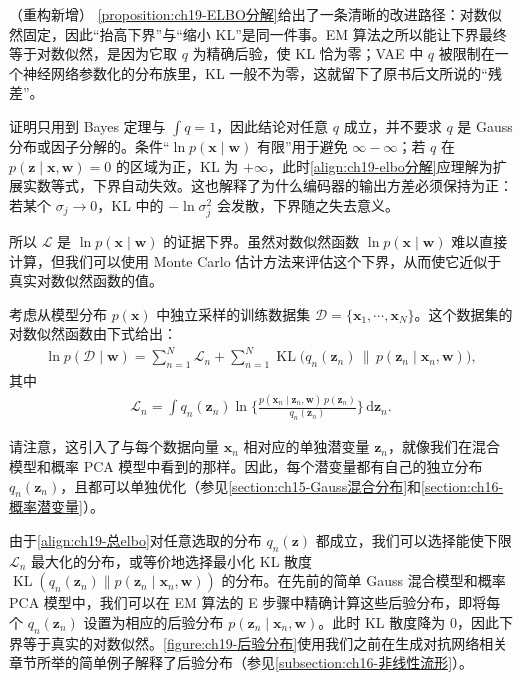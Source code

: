 \documentclass[../../main.tex]{subfiles}
\begin{document}
\begin{remark}（重构新增）
\cref{proposition:ch19-ELBO分解}给出了一条清晰的改进路径：对数似然固定，因此“抬高下界”与“缩小 KL”是同一件事。EM 算法之所以能让下界最终等于对数似然，是因为它取 $q$ 为精确后验，使 KL 恰为零；VAE 中 $q$ 被限制在一个神经网络参数化的分布族里，KL 一般不为零，这就留下了原书后文所说的“残差”。

证明只用到 Bayes 定理与 $\int q=1$，因此结论对任意 $q$ 成立，并不要求 $q$ 是 Gauss 分布或因子分解的。条件“$\ln p(\bm{x}\mid\bm{w})$ 有限”用于避免 $\infty-\infty$；若 $q$ 在 $p(\bm{z}\mid\bm{x},\bm{w})=0$ 的区域为正，KL 为 $+\infty$，此时\eqref{align:ch19-elbo分解}应理解为扩展实数等式，下界自动失效。这也解释了为什么编码器的输出方差必须保持为正：若某个 $\sigma_j\to0$，KL 中的 $-\ln\sigma_j^{2}$ 会发散，下界随之失去意义。
\end{remark}

所以 $\mathcal{L}$ 是 $\ln p(\bm{x}\mid\bm{w})$ 的证据下界。虽然对数似然函数 $\ln p(\bm{x}\mid\bm{w})$ 难以直接计算，但我们可以使用 Monte Carlo 估计方法来评估这个下界，从而使它近似于真实对数似然函数的值。

考虑从模型分布 $p(\bm{x})$ 中独立采样的训练数据集 $\mathcal{D}=\{\bm{x}_1,\cdots,\bm{x}_N\}$。这个数据集的对数似然函数由下式给出：
\begin{align}
\ln p(\mathcal{D}\mid\bm{w})=\sum_{n=1}^{N}\mathcal{L}_n+\sum_{n=1}^{N}\operatorname{KL}\big(q_n(\bm{z}_n)\,\|\,p(\bm{z}_n\mid\bm{x}_n,\bm{w})\big),
\label{align:ch19-总elbo}
\end{align}
其中
\begin{align}
\mathcal{L}_n=\int q_n(\bm{z}_n)\ln\Big\{\frac{p(\bm{x}_n\mid\bm{z}_n,\bm{w})\,p(\bm{z}_n)}{q_n(\bm{z}_n)}\Big\}\,\mathrm{d}\bm{z}_n.
\label{align:ch19-逐点elbo}
\end{align}

请注意，这引入了与每个数据向量 $\bm{x}_n$ 相对应的单独潜变量 $\bm{z}_n$，就像我们在混合模型和概率 PCA 模型中看到的那样。因此，每个潜变量都有自己的独立分布 $q_n(\bm{z}_n)$，且都可以单独优化（参见\cref{section:ch15-Gauss混合分布}和\cref{section:ch16-概率潜变量}）。

由于\eqref{align:ch19-总elbo}对任意选取的分布 $q_n(\bm{z})$ 都成立，我们可以选择能使下限 $\mathcal{L}_n$ 最大化的分布，或等价地选择最小化 KL 散度 $\operatorname{KL}(q_n(\bm{z}_n)\|p(\bm{z}_n\mid\bm{x}_n,\bm{w}))$ 的分布。在先前的简单 Gauss 混合模型和概率 PCA 模型中，我们可以在 EM 算法的 E 步骤中精确计算这些后验分布，即将每个 $q_n(\bm{z}_n)$ 设置为相应的后验分布 $p(\bm{z}_n\mid\bm{x}_n,\bm{w})$。此时 KL 散度降为 $0$，因此下界等于真实的对数似然。\cref{figure:ch19-后验分布}使用我们之前在生成对抗网络相关章节所举的简单例子解释了后验分布（参见\cref{subsection:ch16-非线性流形}）。
\end{document}
